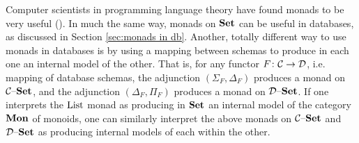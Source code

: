 \documentclass[CT4S-EN-RU]{subfiles}
\begin{document}
\begin{blockENG}
Computer scientists in programming language theory have found monads to be very useful (\cite{Mog}). In much the same way, monads on ${\mathbf{Set}}$ can be useful in databases, as discussed in Section \ref{sec:monads in db}. Another, totally different way to use monads in databases is by using a mapping between schemas to produce in each one an internal model of the other. That is, for any functor $F\colon\mathcal{C}\rightarrow\mathcal{D}$, i.e. mapping of database schemas, the adjunction $(\Sigma_F,\Delta_F)$ produces a monad on $\mathcal{C}{\text \textendash}{\mathbf{Set}}$, and the adjunction $(\Delta_F,\Pi_F)$ produces a monad on $\mathcal{D}{\text \textendash}{\mathbf{Set}}$. If one interprets the $\textnormal{List}$ monad as producing in ${\mathbf{Set}}$ an internal model of the category ${\mathbf{Mon}}$ of monoids, one can similarly interpret the above monads on $\mathcal{C}{\text \textendash}{\mathbf{Set}}$ and $\mathcal{D}{\text \textendash}{\mathbf{Set}}$ as producing internal models of each within the other.
\end{blockENG}

\begin{blockRUS}
\end{blockRUS}
\end{document}
